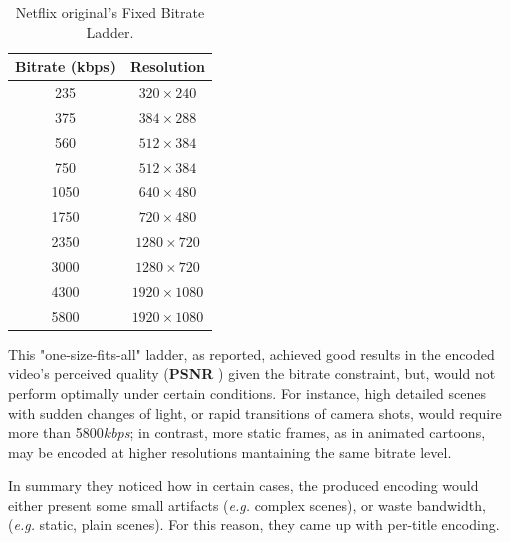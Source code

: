 \begin{table}[htb]
  \centering
  \begin{tabular}{|c|c|}
    \hline
    \textbf{Bitrate (kbps)} & \textbf{Resolution} \\
    \hline
    235                     &    $320\times240$ \\
    \hline
    375                     &    $384\times288$ \\
    \hline
    560                     &    $512\times384$ \\
    \hline
    750                     &    $512\times384$ \\
    \hline
    1050                    &    $640\times480$ \\
    \hline
    1750                    &    $720\times480$ \\
    \hline
    2350                    &   $1280\times720$ \\
    \hline
    3000                    &   $1280\times720$ \\
    \hline
    4300                    &   $1920\times1080$ \\
    \hline
    5800                    &   $1920\times1080$ \\
    \hline
  \end{tabular}
  \caption{Netflix original's Fixed Bitrate Ladder.}
  \label{tab:fixed-ladder}
\end{table}

This "one-size-fits-all" ladder, as reported, achieved good results in the
encoded video's perceived quality (\textbf{PSNR} \cite{psnr}) given the bitrate
constraint, but, would not perform optimally under certain conditions. For
instance, high detailed scenes with sudden changes of light, or rapid
transitions of camera shots, would require more than 5800\emph{kbps}; in
contrast, more static frames, as in animated cartoons, may be encoded at higher
resolutions mantaining the same bitrate level.

In summary they noticed how in certain cases, the produced encoding would
either present some small artifacts (\emph{e.g.} complex scenes), or waste
bandwidth, (\emph{e.g.} static, plain scenes). For this reason, they came up
with per-title encoding.

